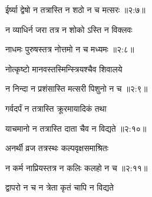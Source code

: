 
{\devanagarifont ईर्ष्या द्वेषो न तत्रास्ति न शठो न च मत्सरः {॥२:७॥} \veg\dontdisplaylinenum }%

{\devanagarifont न व्याधिर्न जरा तत्र न शोको ऽस्ति न विक्लवः \thinspace{\dandab} \dontdisplaylinenum }%


{\devanagarifont नाधमः पुरुषस्तत्र नोत्तमो न च मध्यमः {॥२:८॥} \veg\dontdisplaylinenum }%
 
{\devanagarifont नोत्कृष्टो मानवस्तस्मिन्स्त्रियश्चैव शिवालये \thinspace{\dandab} \dontdisplaylinenum }%


{\devanagarifont न निन्दा न प्रशंसास्ति मत्सरी पिशुनो न च {॥२:९॥} \veg\dontdisplaylinenum }%

{\devanagarifont गर्वदर्पं न तत्रास्ति क्रूरमायादिकं तथा \thinspace{\dandab} \dontdisplaylinenum }%
 

{\devanagarifont याचमानो न तत्रास्ति दाता चैव न विद्यते {॥२:१०॥} \veg\dontdisplaylinenum }%

{\devanagarifont अनर्थी व्रज तत्रस्थः कल्पवृक्षसमाश्रितः \thinspace{\dandab} \dontdisplaylinenum }%


{\devanagarifont न कर्म नाप्रियस्तत्र न कलिः कलहो न च {॥२:११॥} \veg\dontdisplaylinenum }%

{\devanagarifont द्वापरो न च न त्रेता कृतं चापि न विद्यते \thinspace{\dandab} \dontdisplaylinenum }%


